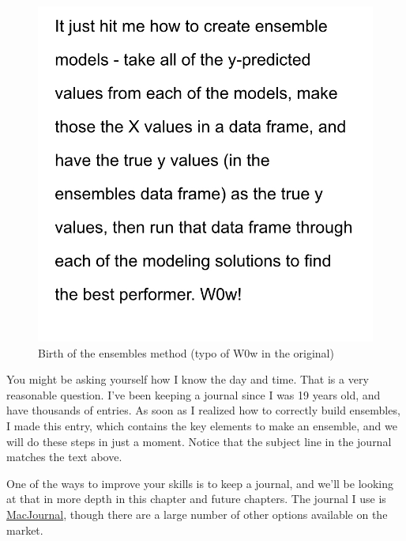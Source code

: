\documentclass[
]{book}
\begin{document}
\begin{figure}
\centering
\includegraphics{_book/images/Birth_of_ensembles.jpg}
\caption{Birth of the ensembles method (typo of W0w in the
original)}
\end{figure}

You might be asking yourself how I know the day and time. That is a very
reasonable question. I've been keeping a journal since I was 19 years
old, and have thousands of entries. As soon as I realized how to
correctly build ensembles, I made this entry, which contains the key
elements to make an ensemble, and we will do these steps in just a
moment. Notice that the subject line in the journal matches the text
above.

One of the ways to improve your skills is to keep a journal, and we'll
be looking at that in more depth in this chapter and future chapters.
The journal I use is \href{https://danschimpf.com/}{MacJournal}, though there
are a large number of other options available on the market.
\end{document}
